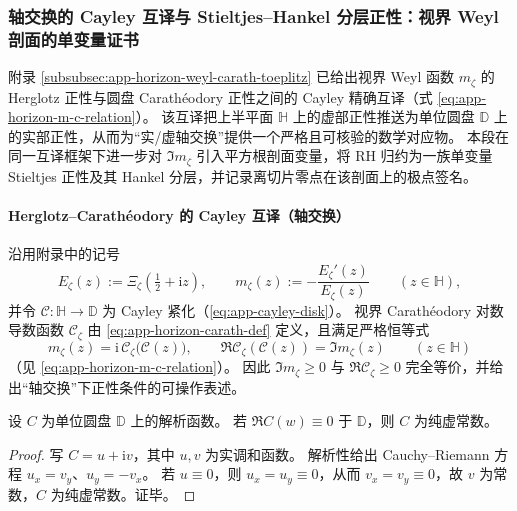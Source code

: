 \subsubsection{轴交换的 Cayley 互译与 Stieltjes--Hankel 分层正性：视界 Weyl 剖面的单变量证书}\label{subsubsec:xi-axis-swap-stieltjes-hankel-positivity}
附录 \ref{subsubsec:app-horizon-weyl-carath-toeplitz} 已给出视界 Weyl 函数 \(m_{\zeta}\) 的 Herglotz 正性与圆盘 Carath\'eodory 正性之间的 Cayley 精确互译（式 \eqref{eq:app-horizon-m-c-relation}）。
该互译把上半平面 \(\mathbb{H}\) 上的虚部正性推送为单位圆盘 \(\mathbb{D}\) 上的实部正性，从而为“实/虚轴交换”提供一个严格且可核验的数学对应物。
本段在同一互译框架下进一步对 \(\Im m_{\zeta}\) 引入平方根剖面变量，将 RH 归约为一族单变量 Stieltjes 正性及其 Hankel 分层，并记录离切片零点在该剖面上的极点签名。

\paragraph{Herglotz--Carath\'eodory 的 Cayley 互译（轴交换）}
沿用附录中的记号
\[
E_{\zeta}(z):=\Xi_{\zeta}\!\left(\tfrac12+\mathrm{i}z\right),\qquad
m_{\zeta}(z):=-\frac{E_{\zeta}'(z)}{E_{\zeta}(z)}\qquad(z\in\mathbb{H}),
\]
并令 \(\mathcal{C}:\mathbb{H}\to\mathbb{D}\) 为 Cayley 紧化（\eqref{eq:app-cayley-disk}）。
视界 Carath\'eodory 对数导数函数 \(\mathscr{C}_{\zeta}\) 由 \eqref{eq:app-horizon-carath-def} 定义，且满足严格恒等式
\[
m_{\zeta}(z)=\mathrm{i}\,\mathscr{C}_{\zeta}\!\bigl(\mathcal{C}(z)\bigr),
\qquad
\Re \mathscr{C}_{\zeta}(\mathcal{C}(z))=\Im m_{\zeta}(z)\qquad(z\in\mathbb{H})
\]
（见 \eqref{eq:app-horizon-m-c-relation}）。
因此 \(\Im m_{\zeta}\ge 0\) 与 \(\Re \mathscr{C}_{\zeta}\ge 0\) 完全等价，并给出“轴交换”下正性条件的可操作表述。

\begin{proposition}\label{prop:xi-carath-degeneracy-pure-imag-constant}
设 \(C\) 为单位圆盘 \(\mathbb{D}\) 上的解析函数。
若 \(\Re C(w)\equiv 0\) 于 \(\mathbb{D}\)，则 \(C\) 为纯虚常数。
\end{proposition}
\begin{proof}
写 \(C=u+\mathrm{i}v\)，其中 \(u,v\) 为实调和函数。
解析性给出 Cauchy--Riemann 方程 \(u_x=v_y\)、\(u_y=-v_x\)。
若 \(u\equiv 0\)，则 \(u_x=u_y\equiv 0\)，从而 \(v_x=v_y\equiv 0\)，故 \(v\) 为常数，\(C\) 为纯虚常数。证毕。
\end{proof}


